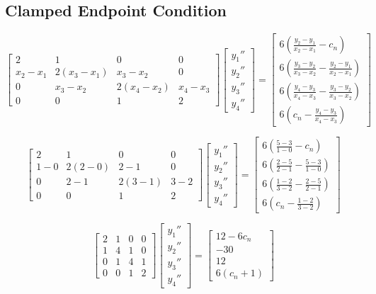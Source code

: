 \documentclass[11pt]{article} %
\begin{document}
\subsection*{Clamped Endpoint Condition}
$$\begin{bmatrix} 2 & 1 & 0 & 0 \\ x_2 - x_1 & 2(x_3 - x_1) & x_3 - x_2 & 0 
		 \\ 0 & x_3 - x_2 & 2(x_4 - x_2) & x_4 - x_3 \\ 0 & 0 & 1 & 2
\end{bmatrix}
\begin{bmatrix} y_1'' \\ y_2'' \\ y_3'' \\ y_4'' \end{bmatrix} = 
\begin{bmatrix} 6\left(  \frac{y_2-y_1}{x_2 - x_1} -c_n  \right)\\ 6\left( \frac{y_3 - y_2}{x_3 - x_2} - \frac{y_2-y_1}{x_2 - x_1} \right) \\ 
			 6\left( \frac{y_4 - y_3}{x_4 - x_3} - \frac{y_3-y_2}{x_3 - x_2} \right) \\  6\left( c_n - \frac{y_4 - y_3}{x_4 - x_3} \right)\end{bmatrix}$$

$$\begin{bmatrix} 2 & 1 & 0 & 0 \\ 1 - 0 & 2(2 -0) &2 -1 & 0 
		 \\ 0 & 2 - 1 & 2(3 -1) & 3 - 2 \\ 0 & 0 & 1 & 2
\end{bmatrix}
\begin{bmatrix} y_1'' \\ y_2'' \\ y_3'' \\ y_4'' \end{bmatrix} = 
\begin{bmatrix} 6\left(  \frac{5-3}{1-0} -c_n  \right)\\  6\left( \frac{2 - 5}{2 - 1} - \frac{5-3}{1 - 0} \right) \\ 
			 6\left( \frac{1 - 2}{3 - 2} - \frac{2-5}{2 - 1} \right) \\  6\left( c_n -  \frac{1 - 2}{3 - 2} \right)\end{bmatrix}$$

$$\begin{bmatrix} 2 & 1 & 0 & 0 \\ 1 & 4 &1 & 0 
		 \\ 0 & 1 & 4 & 1 \\ 0 & 0 & 1 & 2
\end{bmatrix}
\begin{bmatrix} y_1'' \\ y_2'' \\ y_3'' \\ y_4'' \end{bmatrix} = 
\begin{bmatrix} 12-6c_n \\ -30 \\ 12 \\ 6(c_n +1) \end{bmatrix}$$
\end{document}
